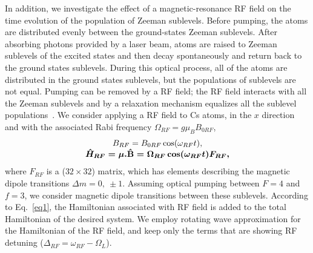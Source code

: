 \documentclass[a4paper]{article}
\begin{document}
\newpage
In addition, we investigate the effect of a magnetic-resonance RF field on the time evolution of the population of Zeeman sublevels. Before pumping, the atoms are distributed evenly between the ground-states Zeeman sublevels. After absorbing photons provided by a laser beam, atoms are raised to Zeeman sublevels of the excited states and then decay spontaneously and return back to the ground states sublevels. During this optical process, all of the  atoms are distributed in the ground states sublevels, but the populations of sublevels are not equal. Pumping can be removed by a RF field; the RF field interacts with all the Zeeman sublevels and by a relaxation mechanism equalizes all the sublevel populations~\cite{r24}. 
We consider applying a RF field to Cs atoms, in the $x$ direction and with the associated Rabi frequency $\Omega_{RF}=g\mu_B B_{0RF}$, 
\begin{equation}
\begin{array}{ccl}
 B_{RF} = B_{0RF}\cos(\omega_{RF}t),\\
 \hat{H}_{RF} =\boldmath\mu .\hat{\textbf{B}}=\Omega_{RF}\cos(\omega_{RF}t)F_{RF},
\end{array}
\end{equation}
where $F_{RF}$ is a  ($32\times 32$) matrix, which has elements describing the magnetic dipole transitions $\Delta m=0,\ \pm 1$. Assuming optical pumping between $F=4$ and $f=3$, we consider magnetic dipole transitions between these sublevels. According to Eq.~\ref{eq1},  the Hamiltonian associated with RF field is added to the total Hamiltonian of the desired system. We employ rotating wave approximation for the Hamiltonian of the RF field, and keep only the terms that are showing RF detuning ($\Delta_{RF}=\omega_{RF}-\Omega_L$). 
\end{document}
